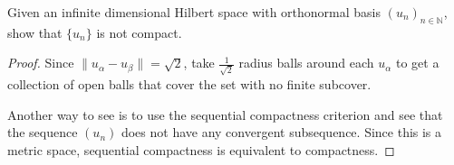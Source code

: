 

\begin{example}
  Given an infinite dimensional Hilbert space with orthonormal basis
  $(u_n)_{n \in \mathbb{N}}$, show that $\{ u_n \}$ is not compact.
\end{example}
\begin{proof}
  Since $\|u_\alpha - u_\beta\| = \sqrt{2}$, take
  $\frac{1}{\sqrt{2}}$ radius balls around each $u_\alpha$ to get a
  collection of open balls that cover the set with no finite subcover.

  Another way to see is to use the sequential compactness criterion
  and see that the  sequence $(u_n)$ does not have any convergent subsequence.
  Since this is a metric space, sequential compactness is equivalent
  to compactness.
\end{proof}

